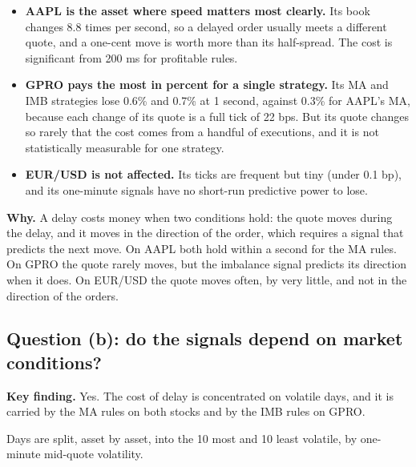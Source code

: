 \documentclass[11pt]{article}
\newcommand{\keyfinding}[1]{%
  \begingroup\setlength{\fboxsep}{9pt}%
  \noindent\colorbox{boxbg}{\parbox{\dimexpr\linewidth-2\fboxsep\relax}{\textbf{\color{accent}Key finding.} #1}}%
  \endgroup\par\vspace{0.5em}}
\begin{document}
\begin{itemize}
  \item \textbf{AAPL is the asset where speed matters most clearly.} Its book
        changes 8.8 times per second, so a delayed order usually meets a different
        quote, and a one-cent move is worth more than its half-spread. The cost is
        significant from 200 ms for profitable rules.
  \item \textbf{GPRO pays the most in percent for a single strategy.} Its MA and
        IMB strategies lose 0.6\% and 0.7\% at 1 second, against 0.3\% for AAPL's
        MA, because each change of its quote is a full tick of 22 bps. But its
        quote changes so rarely that the cost comes from a handful of executions,
        and it is not statistically measurable for one strategy.
  \item \textbf{EUR/USD is not affected.} Its ticks are frequent but tiny (under
        0.1 bp), and its one-minute signals have no short-run predictive power to
        lose.
\end{itemize}

\textbf{Why.} A delay costs money when two conditions hold: the quote moves during
the delay, and it moves in the direction of the order, which requires a signal
that predicts the next move. On AAPL both hold within a second for the MA rules.
On GPRO the quote rarely moves, but the imbalance signal predicts its direction
when it does. On EUR/USD the quote moves often, by very little, and not in the
direction of the orders.

\subsection{Question (b): do the signals depend on market conditions?}

\keyfinding{Yes. The cost of delay is concentrated on volatile days, and it is
carried by the MA rules on both stocks and by the IMB rules on GPRO.}

Days are split, asset by asset, into the 10 most and 10 least volatile, by
one-minute mid-quote volatility.

\begin{table}[H]
  \centering
  \small
  \caption{Signals across volatility regimes, over the rule universe.}
  \label{tab:regimes}
  
\end{table}
\end{document}
